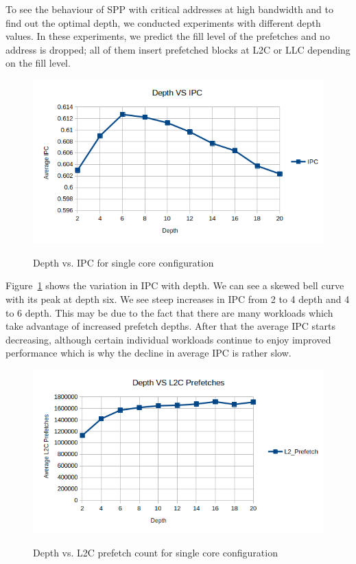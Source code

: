 To see the behaviour of SPP with critical addresses at high bandwidth and to find out the optimal depth, we conducted experiments with different depth values. In these experiments,
we predict the fill level of the prefetches and no address is dropped; all of them insert prefetched blocks at L2C or LLC depending on the fill level.
\begin{figure}[H]
{\includegraphics[scale=0.7]{images/IPC vs Depth.png}}
\caption{Depth vs. IPC for single core configuration}
\label{fig:depth-ipc}
\end{figure}

Figure~\ref{fig:depth-ipc} shows the variation in IPC with depth.
We can see a skewed bell curve with its peak at depth six. We see steep increases in IPC from 2 to 4 depth and 4 to 6 depth. This may be due to the fact that there are many workloads which take advantage of increased prefetch depths. After that the average IPC starts decreasing, although certain individual workloads continue to enjoy improved performance which is why the decline in average IPC is rather slow.
\begin{figure}[H]
{\includegraphics[scale=0.7]{images/L2 Prefetches vs Depth.png}}
\caption{Depth vs. L2C prefetch count for single core configuration}
\label{fig:depth-l2cpref}
\end{figure}

